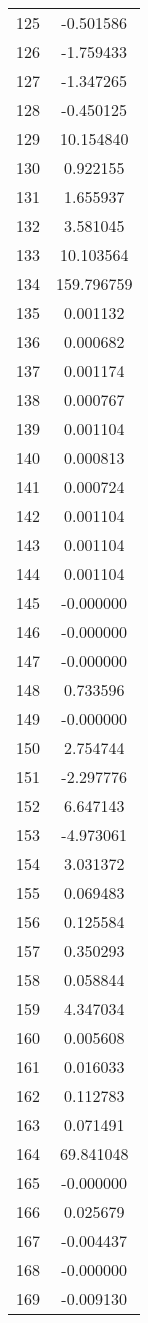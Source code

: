 \documentclass[12pt]{article}
\begin{document}
\begin{longtable}{@{}cc@{}}
125 & -0.501586 \\
126 & -1.759433 \\
127 & -1.347265 \\
128 & -0.450125 \\
129 & 10.154840 \\
130 & 0.922155 \\
131 & 1.655937 \\
132 & 3.581045 \\
133 & 10.103564 \\
134 & 159.796759 \\
135 & 0.001132 \\
136 & 0.000682 \\
137 & 0.001174 \\
138 & 0.000767 \\
139 & 0.001104 \\
140 & 0.000813 \\
141 & 0.000724 \\
142 & 0.001104 \\
143 & 0.001104 \\
144 & 0.001104 \\
145 & -0.000000 \\
146 & -0.000000 \\
147 & -0.000000 \\
148 & 0.733596 \\
149 & -0.000000 \\
150 & 2.754744 \\
151 & -2.297776 \\
152 & 6.647143 \\
153 & -4.973061 \\
154 & 3.031372 \\
155 & 0.069483 \\
156 & 0.125584 \\
157 & 0.350293 \\
158 & 0.058844 \\
159 & 4.347034 \\
160 & 0.005608 \\
161 & 0.016033 \\
162 & 0.112783 \\
163 & 0.071491 \\
164 & 69.841048 \\
165 & -0.000000 \\
166 & 0.025679 \\
167 & -0.004437 \\
168 & -0.000000 \\
169 & -0.009130 \\

\end{longtable}
\end{document}
